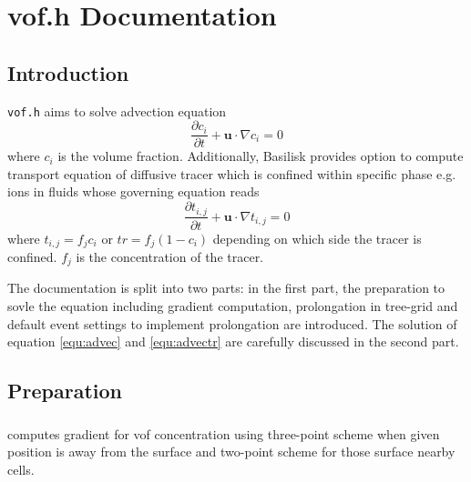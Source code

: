 \chapter{vof.h Documentation}
\ifsingle
\maketitle
\fi
\chaptermeta[1.0][2025-06-07]

\section{Introduction}
\texttt{vof.h} aims to solve advection equation
\begin{equation}\label{equ:advec}
    \frac{\partial c_{i}}{\partial t} + \mathbf{u}\cdot\nabla c_{i} = 0
\end{equation}
where $c_{i}$ is the volume fraction.
Additionally, Basilisk provides option to compute transport equation of diffusive tracer which is confined within specific phase e.g. ions in fluids whose governing equation reads\cite{2015_Lopez}
\begin{equation}\label{equ:advectr}
    \frac{\partial t_{i,j}}{\partial t} + \mathbf{u}\cdot\nabla t_{i,j} = 0
\end{equation}
where $t_{i,j}=f_{j} c_{i}$ or $tr=f_{j} (1-c_{i})$ depending on which side the tracer is confined. $f_{j}$ is the concentration of the tracer.\par
The documentation is split into two parts: in the first part, the preparation to sovle the equation including gradient computation, prolongation in tree-grid and default event settings to implement prolongation are introduced. The solution of equation \ref{equ:advec} and \ref{equ:advectr} are carefully discussed in the second part.

\section{Preparation}
\subsection{}\label{sec:gradient}
 computes gradient for vof concentration using three-point scheme when given position is away from the surface and two-point scheme for those surface nearby cells.
